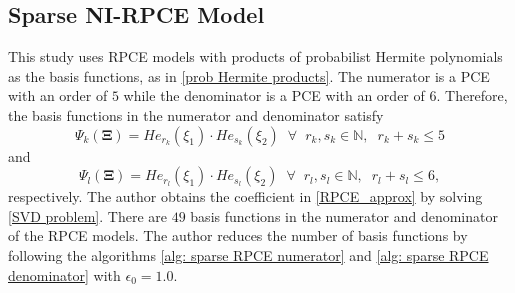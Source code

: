 %
%

\subsection{Sparse NI-RPCE Model}
\label{ssec: surrogate model}

This study uses RPCE models with products of probabilist Hermite polynomials as the basis functions, as in \eqref{prob Hermite products}.
The numerator is a PCE with an order of $5$ while the denominator is a PCE with an order of $6$.
Therefore, the basis functions in the numerator and denominator satisfy
\begin{equation}
    \Psi_{k}\left(\mathbf{\Xi}\right)
    =
    {He}_{r_{k}} \left(\xi_{1}\right)
    \cdot
    {He}_{s_{k}} \left(\xi_{2}\right)
    \phantom{x}
    \forall 
    \phantom{x}
    r_{k}, s_{k} \in \mathbb{N}, 
    \phantom{x}
    r_{k} + s_{k} \leq 5
\end{equation}
and
\begin{equation}
    \Psi_{l}\left(\mathbf{\Xi}\right)
    =
    {He}_{r_{l}} \left(\xi_{1}\right)
    \cdot
    {He}_{s_{l}} \left(\xi_{2}\right)
    \phantom{x}
    \forall 
    \phantom{x}
    r_{l}, s_{l} \in \mathbb{N}, 
    \phantom{x}
    r_{l} + s_{l} \leq 6,
\end{equation}
respectively.
The author obtains the coefficient in \eqref{RPCE_approx} by solving \eqref{SVD problem}.
There are $49$ basis functions in the numerator and denominator of the RPCE models.
The author reduces the number of basis functions by following the algorithms \ref{alg: sparse RPCE numerator} and \ref{alg: sparse RPCE denominator} with $\epsilon_{0}=1.0$.